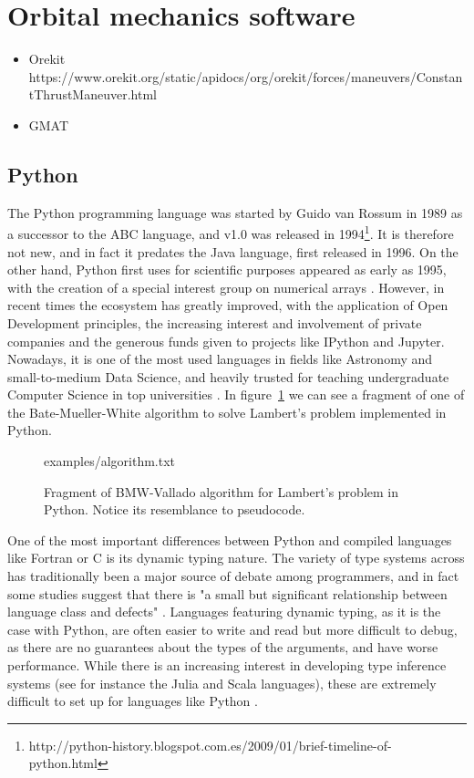 \section{Orbital mechanics software}


\begin{itemize}
\item Orekit https://www.orekit.org/static/apidocs/org/orekit/forces/maneuvers/ConstantThrustManeuver.html
\item GMAT 
\end{itemize}

\subsection{Python} \label{sec:python}

The Python programming language was started by Guido van Rossum in 1989 as a successor to the ABC language, and v1.0 was released in 1994\footnote{http://python-history.blogspot.com.es/2009/01/brief-timeline-of-python.html}. It is therefore not new, and in fact it predates the Java language, first released in 1996. On the other hand, Python first uses for scientific purposes appeared as early as 1995, with the creation of a special interest group on numerical arrays \cite{millman2011python}. However, in recent times the ecosystem has greatly improved, with the application of Open Development principles, the increasing interest and involvement of private companies and the generous funds given to projects like IPython \cite{perez2007ipython} and Jupyter. Nowadays, it is one of the most used languages in fields like Astronomy \cite{momcheva2015software} and small-to-medium Data Science, and heavily trusted for teaching undergraduate Computer Science in top universities \cite{guo2014python}. In figure~\ref{fig:python} we can see a fragment of one of the Bate-Mueller-White algorithm to solve Lambert's problem implemented in Python.

\begin{figure}
\begin{lstinputlisting}[language=Python]{examples/algorithm.txt}
\end{lstinputlisting}
\caption{Fragment of BMW-Vallado algorithm for Lambert's problem in Python. Notice its resemblance to pseudocode.}
\label{fig:python}
\end{figure}

One of the most important differences between Python and compiled languages like Fortran or C is its dynamic typing nature. The variety of type systems across has traditionally been a major source of debate among programmers, and in fact some studies suggest that there is "a small but significant relationship between language class and defects" \cite{ray2014quality}. Languages featuring dynamic typing, as it is the case with Python, are often easier to write and read but more difficult to debug, as there are no guarantees about the types of the arguments, and have worse performance. While there is an increasing interest in developing type inference systems (see for instance the Julia and Scala languages), these are extremely difficult to set up for languages like Python \cite{cannon2005localized}.

